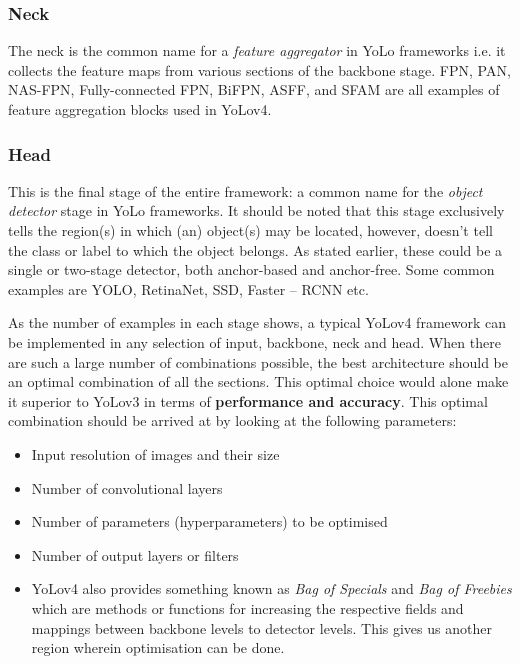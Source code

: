 \subsubsection{Neck}
The neck is the common name for a \textit{feature aggregator} in YoLo frameworks i.e. it collects the feature maps from various sections of the backbone stage. FPN, PAN, NAS-FPN, Fully-connected FPN, BiFPN, ASFF, and SFAM are all examples of feature aggregation blocks used in YoLov4.

\subsubsection{Head}
This is the final stage of the entire framework: a common name for the \textit{object detector} stage in YoLo frameworks. It should be noted that this stage exclusively tells the region(s) in which (an) object(s) may be located, however, doesn’t tell the class or label to which the object belongs. As stated earlier, these could be a single or two-stage detector, both anchor-based and anchor-free. Some common examples are YOLO, RetinaNet, SSD, Faster – RCNN etc.

As the number of examples in each stage shows, a typical YoLov4 framework can be implemented in any selection of input, backbone, neck and head. When there are such a large number of combinations possible, the best architecture should be an optimal combination of all the sections. This optimal choice would alone make it superior to YoLov3 in terms of \textbf{performance and accuracy}. This optimal combination should be arrived at by looking at the following parameters:

\begin{itemize}
  \item Input resolution of images and their size
  \item Number of convolutional layers
  \item Number of parameters (hyperparameters) to be optimised
  \item Number of output layers or filters
  \item YoLov4 also provides something known as \textit{Bag of Specials} and \textit{Bag of Freebies} which are methods or functions for increasing the respective fields and mappings between backbone levels to detector levels. This gives us another region wherein optimisation can be done.

\end{itemize}

\newpage

